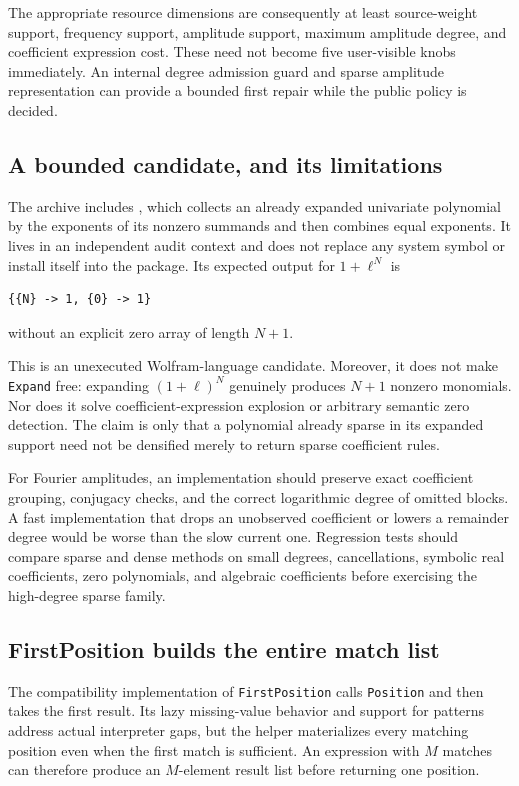 \documentclass[11pt,a4paper]{article}
\newcommand{\code}[1]{\texttt{#1}}
\begin{document}
The appropriate resource dimensions are consequently at least source-weight support, frequency support, amplitude support, maximum amplitude degree, and coefficient expression cost. These need not become five user-visible knobs immediately. An internal degree admission guard and sparse amplitude representation can provide a bounded first repair while the public policy is decided.

\subsection{A bounded candidate, and its limitations}
The archive includes , which collects an already expanded univariate polynomial by the exponents of its nonzero summands and then combines equal exponents. It lives in an independent audit context and does not replace any system symbol or install itself into the package. Its expected output for $1+\ell^N$ is
\begin{lstlisting}[language=Wolfram]
{{N} -> 1, {0} -> 1}
\end{lstlisting}
without an explicit zero array of length $N+1$.

This is an unexecuted Wolfram-language candidate. Moreover, it does not make \code{Expand} free: expanding $(1+\ell)^N$ genuinely produces $N+1$ nonzero monomials. Nor does it solve coefficient-expression explosion or arbitrary semantic zero detection. The claim is only that a polynomial already sparse in its expanded support need not be densified merely to return sparse coefficient rules.

For Fourier amplitudes, an implementation should preserve exact coefficient grouping, conjugacy checks, and the correct logarithmic degree of omitted blocks. A fast implementation that drops an unobserved coefficient or lowers a remainder degree would be worse than the slow current one. Regression tests should compare sparse and dense methods on small degrees, cancellations, symbolic real coefficients, zero polynomials, and algebraic coefficients before exercising the high-degree sparse family.

\subsection{FirstPosition builds the entire match list}
The compatibility implementation of \code{FirstPosition} calls \code{Position} and then takes the first result. Its lazy missing-value behavior and support for patterns address actual interpreter gaps, but the helper materializes every matching position even when the first match is sufficient. An expression with $M$ matches can therefore produce an $M$-element result list before returning one position.\cite{compat}
\end{document}
